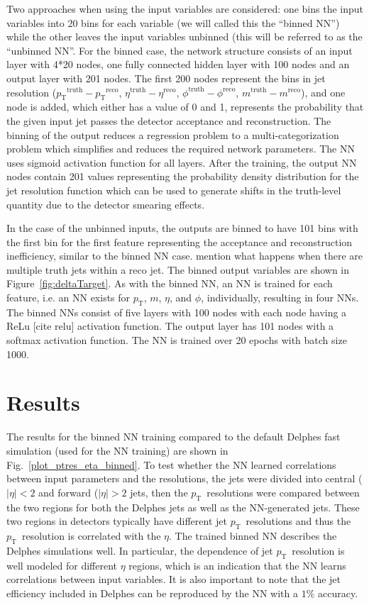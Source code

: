 \documentclass[showpacs,showkeys,preprint,prd,nofootinbib,linenumbers,12pt]{revtex4-1}
\def\pt{\ensuremath{p_{\mathrm{T}}}}
\def\ptRes{\ensuremath{\pt^{\mathrm{truth}}-\pt^{\mathrm{reco}}}}
\def\etaRes{\ensuremath{\eta^{\mathrm{truth}}-\eta^{\mathrm{reco}}}}
\def\phiRes{\ensuremath{\phi^{\mathrm{truth}}-\phi^{\mathrm{reco}}}}
\def\mRes{\ensuremath{m^{\mathrm{truth}}-m^{\mathrm{reco}}}}
\begin{document}
Two approaches when using the input variables are considered: one bins the input variables into 20 bins for each variable (we will called this the ``binned NN'') while the other leaves the input variables unbinned (this will be referred to as the ``unbinned NN''.
For the binned case, the network structure consists of an input layer with 4*20 nodes, one fully connected hidden layer with 100 nodes and an output layer with 201 nodes. The first 200 nodes represent the bins in jet resolution (\ptRes, \etaRes, \phiRes, \mRes), and one node is added, which either has a value of 0 and 1, represents the probability that the given input jet passes the detector acceptance and reconstruction. The binning of the output reduces a regression problem to a multi-categorization problem which simplifies and reduces the required network parameters. The NN uses sigmoid activation function for all layers. After the training, the output NN nodes contain 201 values representing the probability density distribution for the jet resolution function which can be used to generate shifts in the truth-level quantity due to the detector smearing effects.

In the case of the unbinned inputs, the outputs are binned to have 101 bins with the first bin for the first feature representing the acceptance and reconstruction inefficiency, similar to the binned NN case. {\color{red}mention what happens when there are multiple truth jets within a reco jet}. The binned output variables are shown in Figure~\ref{fig:deltaTarget}. 
As with the binned NN, an NN is trained for each feature, i.e. an NN exists for \pt, $m$, $\eta$, and $\phi$, individually, resulting in four NNs. The binned NNs consist of five layers with 100 nodes with each node having a ReLu [cite relu] activation function. The output layer has 101 nodes with a softmax activation function. The NN is trained over 20 epochs with batch size 1000. 

\section{Results}

The results for the binned NN training compared to the default Delphes fast simulation (used for the NN training)
are shown in Fig.~\ref{plot_ptres_eta_binned}.
To test whether the NN learned correlations between input parameters and the resolutions, the jets were divided into central ($|\eta|<2$ and forward ($|\eta|>2$ jets, then the \pt\ resolutions were compared between the two regions for both the Delphes jets as well as the NN-generated jets. These two regions in detectors typically have different jet \pt\ resolutions and thus the \pt\ resolution is correlated with the $\eta$. The trained binned NN describes the Delphes simulations well.
In particular, the dependence of jet \pt\ resolution is well modeled for different $\eta$ regions,
which is an indication that the NN learns correlations between input variables. It is also important to note that the jet efficiency included in Delphes can be reproduced by the NN with a $1\%$ accuracy.
\end{document}
